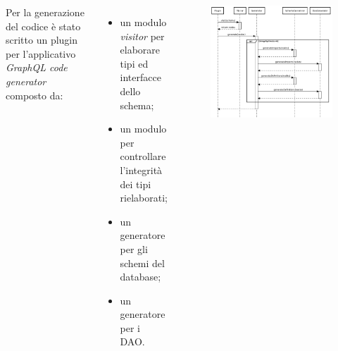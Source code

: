 \documentclass[c]{beamer}
\begin{document}
            \begin{frame}
                \begin{columns}
                        Per la generazione del codice è stato scritto un plugin per l'applicativo \emph{GraphQL code generator} composto da:
                        \begin{itemize}
                            \item un modulo \emph{visitor} per elaborare tipi ed interfacce dello schema;
                            \item un modulo per controllare l'integrità dei tipi rielaborati;
                            \item un generatore per gli schemi del database;
                            \item un generatore per i DAO.
                        \end{itemize}
                        \begin{figure}
                            \includegraphics[scale=0.2]{../generator_workflow.png}
                        \end{figure}
                \end{columns}
            \end{frame}
\end{document}
